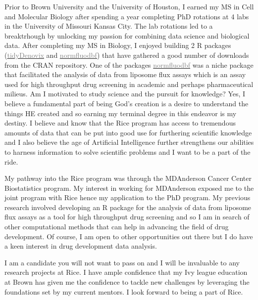 \documentclass[11pt,a4paper]{article} %
\begin{document}
\par

{Prior to Brown University and the University of Houston, I earned my MS in Cell and Molecular Biology after spending a year completing PhD rotations at 4 labs in the University of Missouri Kansas City. The lab rotations led to a breaktrhough by unlocking my passion for combining data science and biological data. After completing my MS in Biology, I enjoyed building 2 R packages (\href{https://alphaprime7.github.io/tidyDenovix/}{\textcolor{gray}{tidyDenovix}} and \href{https://alphaprime7.github.io/normfluodbf/}{\textcolor{gray}{normfluodbf}}) that have gathered a good number of downloads from the CRAN repository. One of the packages \href{https://alphaprime7.github.io/normfluodbf/}{\textcolor{gray}{normfluodbf}} was a niche package that facilitated the analysis of data from liposome flux assays which is an assay used for high throughput drug screening in academic and perhaps pharmaceutical milieus. Am I motivated to study science and the pursuit for knowledge? Yes, I believe a fundamental part of being God's creation is a desire to understand the things HE created and so earning my terminal degree in this endeavor is my destiny. I believe and know that the Rice program has access to tremendous amounts of data that can be put into good use for furthering scientific knowledge and I also believe the age of Artificial Intelligence further strengthens our abilities to harness information to solve scientific problems and I want to be a part of the ride.}

\par

{My pathway into the Rice program was through the MDAnderson Cancer Center Biostatistics program. My interest in working for MDAnderson exposed me to the joint program with Rice hence my application to the PhD program. My previous research involved developing an R package for the analysis of data from liposome flux assays as a tool for high throughput drug screening and so I am in search of other computational methods that can help in advancing the field of drug development. Of course, I am open to other opportunities out there but I do have a keen interest in drug development data analysis.}


\par

{I am a candidate you will not want to pass on and I will be invaluable to any research projects at Rice. I have ample confidence that my Ivy league education at Brown has given me the confidence to tackle new challenges by leveraging the foundations set by my current mentors. I look forward to being a part of Rice.}
\end{document}
